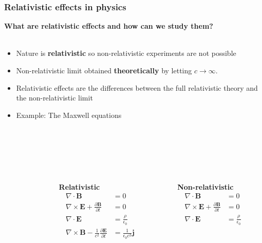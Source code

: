 \documentclass[mathserif,8pt]{beamer}
\begin{document}
\begin{frame}
    \frametitle{Relativistic effects in physics}
    \textbf{What are relativistic effects and how can we study them?}\\
    \ \\
    \begin{itemize}
        \item	Nature is \textbf{relativistic} so non-relativistic experiments are not possible
        \item	Non-relativistic limit obtained \textbf{theoretically} by letting $c\rightarrow\infty$.
        \item	Relativistic effects are the differences between the full relativistic theory and
		the non-relativistic limit
        \item	Example: The Maxwell equations
    \end{itemize}
    \ \\
    \ \\
    \ \\
    \ \\
    \pause
    \begin{columns}
    \begin{column}{.10\textwidth}
	\ \\
    \end{column}
    \begin{column}{.35\textwidth}
	\centering
	\ \ \ \textbf{Relativistic}
	\begin{align}
	    \nonumber
	    \nabla \cdot  \boldsymbol{B} &= 0\\
	    \nonumber
	    \nabla \times \boldsymbol{E} + \frac{\partial \boldsymbol{B}}{\partial t} &= 0\\
	    \nonumber
	    \nabla \cdot  \boldsymbol{E} &= \frac{\rho}{\epsilon_0}\\
	    \nonumber
	    \nabla \times \boldsymbol{B} - \frac{1}{c^2}\frac{\partial \boldsymbol{E}}{\partial t} &= 
		\frac{1}{\epsilon_0 c^2} \boldsymbol{j}
	\end{align}
    \end{column}
    \pause
    \begin{column}{.35\textwidth}
	\centering
	\ \ \ \ \textbf{Non-relativistic}
	\begin{align}
	    \nonumber
	    \nabla \cdot  \boldsymbol{B} &= 0\\
	    \nonumber
	    \nabla \times \boldsymbol{E} + \frac{\partial \boldsymbol{B}}{\partial t} &= 0\\
	    \nonumber
	    \nabla \cdot  \boldsymbol{E} &= \frac{\rho}{\epsilon_0}\\

\end{align}
\end{column}
\end{columns}
\end{frame}
\end{document}
